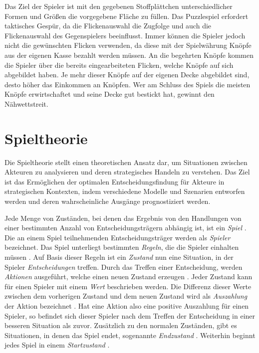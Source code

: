 Das Ziel der Spieler ist mit den gegebenen Stoffplättchen unterschiedlicher Formen und Größen die vorgegebene Fläche zu füllen. Das Puzzlespiel erfordert taktisches Gespür, da die Flickenauswahl die Zugfolge und auch die Flickenauswahl des Gegenspielers beeinflusst. Immer können die Spieler jedoch nicht die gewünschten Flicken verwenden, da diese mit der Spielwährung Knöpfe aus der eigenen Kasse bezahlt werden müssen. An die begehrten Knöpfe kommen die Spieler über die bereits eingearbeiteten Flicken, welche Knöpfe auf sich abgebildet haben. Je mehr dieser Knöpfe auf der eigenen Decke abgebildet sind, desto höher das Einkommen an Knöpfen. Wer am Schluss des Spiels die meisten Knöpfe erwirtschaftet und seine Decke gut bestickt hat, gewinnt den Nähwettstreit. \cite{SpielDesJahresPatchwork}

\vspace*{-10cm}
\pagebreak

\section{Spieltheorie}
\label{chapter:spieltheorie}

Die Spieltheorie stellt einen theoretischen Ansatz dar, um Situationen zwischen Akteuren zu analysieren und deren strategisches Handeln zu verstehen. Das Ziel ist das Ermöglichen der optimalen Entscheidungsfindung für Akteure in strategischen Kontexten, indem verschiedene Modelle und Szenarien entworfen werden und deren wahrscheinliche Ausgänge prognostiziert werden. \cite{2024.GameTheory}

Jede Menge von Zuständen, bei denen das Ergebnis von den Handlungen von einer bestimmten Anzahl von Entscheidungsträgern abhängig ist, ist ein \emph{Spiel} \cite{2024.GameTheory}. Die an einem Spiel teilnehmenden Entscheidungsträger werden als \emph{Spieler} bezeichnet. Das Spiel unterliegt bestimmten \emph{Regeln}, die die Spieler einhalten müssen \cite[S. 1]{2014.GameTheoryThroughExamples}. Auf Basis dieser Regeln ist ein \emph{Zustand} nun eine Situation, in der Spieler \emph{Entscheidungen} treffen. Durch das Treffen einer Entscheidung, werden \emph{Aktionen} ausgeführt, welche einen neuen Zustand erzeugen \cite[S. 1]{2014.GameTheoryThroughExamples}. Jeder Zustand kann für einen Spieler mit einem \emph{Wert} beschrieben werden. Die Differenz dieser Werte zwischen dem vorherigen Zustand und dem neuen Zustand wird als \emph{Auszahlung} der Aktion bezeichnet \cite{2024.GameTheory}. Hat eine Aktion also eine positive Auszahlung für einen Spieler, so befindet sich dieser Spieler nach dem Treffen der Entscheidung in einer besseren Situation als zuvor. Zusätzlich zu den normalen Zuständen, gibt es Situationen, in denen das Spiel endet, sogenannte \emph{Endzustand} \cite[S. 53]{2014.GameTheoryThroughExamples}. Weiterhin beginnt jedes Spiel in einem \emph{Startzustand} \cite[S. 53]{2014.GameTheoryThroughExamples}.

